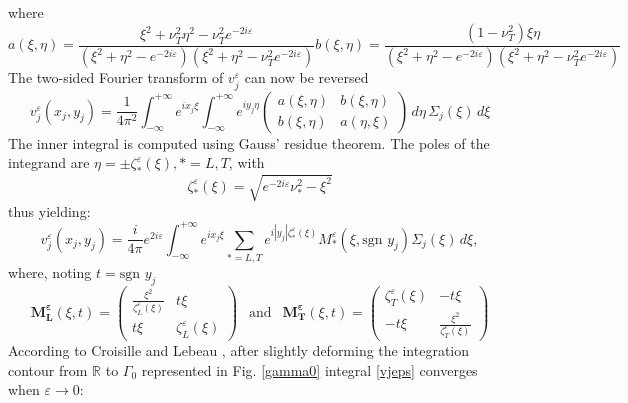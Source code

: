 where
\begin{subequations}
\begin{equation}
a(\xi,\eta)=\frac{\xi^2+\nu_T^2 \eta^2-\nu_T^2e^{-2i\varepsilon}}{(\xi^2+\eta^2-e^{-2i\varepsilon})(\xi^2+\eta^2-\nu_T^2e^{-2i\varepsilon})}
\end{equation}
\begin{equation}
b(\xi,\eta)=\frac{(1-\nu_T^2)\xi \eta}{(\xi^2+\eta^2-e^{-2i\varepsilon})(\xi^2+\eta^2-\nu_T^2e^{-2i\varepsilon})}
\end{equation}
\end{subequations}
The two-sided Fourier transform of $v_j^{\varepsilon}$ can now be reversed
\begin{equation}
v_j^{\varepsilon}(x_j,y_j)=\frac{1}{4\pi^2}\int_{- \infty}^{+ \infty} e^{ix_j\xi} \int_{-\infty}^{+\infty}e^{iy_j\eta}\begin{pmatrix}
a(\xi,\eta) & b(\xi,\eta) \\
b(\xi,\eta) & a(\eta,\xi)
\end{pmatrix} \,d\eta\, \Sigma_j(\xi) \,d\xi
 \label{invdouble}
\end{equation}
The inner integral is computed using Gauss' residue theorem. The poles of the integrand are $\eta=\pm \zeta_*^{\varepsilon}(\xi), *=L,T$, with
\begin{equation}
\zeta_*^{\varepsilon}(\xi)=\sqrt{e^{-2i\varepsilon}\nu_*^2-\xi^2}
\label{defzetaeps}
\end{equation}
thus yielding:
\begin{equation}
v_j^{\varepsilon}(x_j,y_j)=\frac{i}{4\pi}e^{2i\varepsilon}\int_{-\infty}^{+\infty} e^{ix_j\xi}\sum_{*=L,T}e^{i|y_j|\zeta_*^{\varepsilon}(\xi)}M_*^{\varepsilon}(\xi,\mbox{sgn }y_j)\Sigma_j(\xi)\,d\xi,
\label{vjeps}
\end{equation}
where, noting $t=\mbox{sgn }y_j$
\begin{equation}
\mathbf{M_L^{\varepsilon}}(\xi,t)=\begin{pmatrix}
\frac{\xi^2}{\zeta_L^{\varepsilon}(\xi)} &t\xi \\
t\xi & \zeta_L^{\varepsilon}(\xi)
\end{pmatrix}
~~\mbox{  and  }~~
\mathbf{M_T^{\varepsilon}}(\xi,t)=\begin{pmatrix}
\zeta_T^{\varepsilon}(\xi) & -t\xi \\
-t\xi & \frac{\xi^2}{\zeta_T^{\varepsilon}(\xi)}
\end{pmatrix}
\label{M*eps}
\end{equation}
According to Croisille and Lebeau \cite{CroisilleLebeau}, after slightly deforming the integration contour from $\mathbb{R}$ to $\Gamma_0$ represented in Fig. \ref{gamma0} integral \eqref{vjeps} converges when $\varepsilon \rightarrow 0$: 
